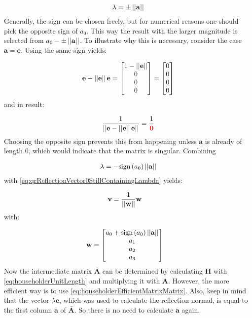 \begin{align}
\lambda = \pm \left\vert\left\vert\mathbf{a}\right\vert\right\vert
\end{align}
%
Generally, the sign can be chosen freely, but for numerical reasons one should pick the opposite sign of $a_0$. 
This way the result with the larger magnitude is selected from $a_0 -  \pm \left\vert\left\vert\mathbf{a}\right\vert\right\vert$.
To illustrate why this is necessary, consider the case $\mathbf{a} = \mathbf{e}$.
Using the same sign yields:

\begin{align}
\mathbf{e} - \left\vert\left\vert\mathbf{e}\right\vert\right\vert\mathbf{e} 
=
\begin{bmatrix}
1 - \left\vert\left\vert\mathbf{e}\right\vert\right\vert\\
0\\
0\\
0
\end{bmatrix}
=
\begin{bmatrix}
0\\
0\\
0\\
0 
\end{bmatrix}
\end{align}
%
and in result:

\begin{align}
\frac{1}{\left\vert\left\vert\mathbf{e} - \left\vert\left\vert\mathbf{e}\right\vert\right\vert\mathbf{e}\right\vert\right\vert} = \frac{1}{\color{red}{\mathbf{0}}}
\end{align}
%
Choosing the opposite sign prevents this from happening unless $\mathbf{a}$ is already of length 0, which would indicate that the matrix is singular.
Combining 


\begin{align}
\lambda = -\textrm{sign}\left(a_0\right) \left\vert\left\vert\mathbf{a}\right\vert\right\vert
\end{align}
%
with \cref{eq:qrReflectionVector0StillContainingLambda} yields:



\begin{align}
\mathbf{v} 
&=
\frac{1}{\left\vert\left\vert\mathbf{w}\right\vert\right\vert}\mathbf{w}
\end{align}
%
with:

\begin{align}
\mathbf{w} 
&=
\begin{bmatrix}
a_0 + \textrm{sign}\left(a_0\right) \left\vert\left\vert\mathbf{a}\right\vert\right\vert\\
a_1\\
a_2\\
a_3
\end{bmatrix}
\end{align}
%
Now the intermediate matrix $\mathbf{\bar{A}}$ can be determined by calculating $\mathbf{H}$ with \cref{eq:householderUnitLength} and multiplying it with $\mathbf{A}$.
However, the more efficient way is to use \cref{eq:householderEfficientMatrixMatrix}.
Also, keep in mind that the vector $\lambda\mathbf{e}$, which was used to calculate the reflection normal, is equal to the first column $\mathbf{\bar{a}}$ of $\mathbf{\bar{A}}$.
So there is no need to calculate $\mathbf{\bar{a}}$ again.

